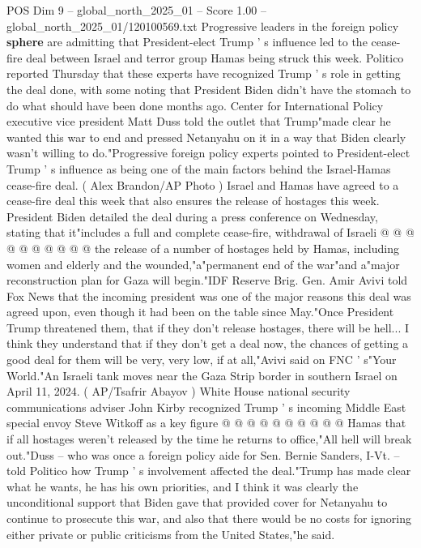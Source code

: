 \begin{textsample}{POS Dim 9 – global\_north\_2025\_01 – Score 1.00 – global\_north\_2025\_01/120100569.txt}  \label{ex:f9_pos_353}
Progressive leaders in the foreign policy \textbf{sphere} are admitting that President-elect Trump ' s influence led to the cease-fire deal between Israel and terror group Hamas being struck this week.
Politico reported Thursday that these experts have recognized Trump ' s role in getting the deal done, with some noting that President Biden didn't have the stomach to do what should have been done months ago.
Center for International Policy executive vice president Matt Duss told the outlet that Trump"made clear he wanted this war to end and pressed Netanyahu on it in a way that Biden clearly wasn't willing to do."Progressive foreign policy experts pointed to President-elect Trump ' s influence as being one of the main factors behind the Israel-Hamas cease-fire deal. ( Alex Brandon/AP Photo ) Israel and Hamas have agreed to a cease-fire deal this week that also ensures the release of hostages this week.
President Biden detailed the deal during a press conference on Wednesday, stating that it"includes a full and complete cease-fire, withdrawal of Israeli @ @ @ @ @ @ @ @ @ @ the release of a number of hostages held by Hamas, including women and elderly and the wounded,"a"permanent end of the war"and a"major reconstruction plan for Gaza will begin."IDF Reserve Brig.
Gen.
Amir Avivi told Fox News that the incoming president was one of the major reasons this deal was agreed upon, even though it had been on the table since May."Once President Trump threatened them, that if they don't release hostages, there will be hell...
I think they understand that if they don't get a deal now, the chances of getting a good deal for them will be very, very low, if at all,"Avivi said on FNC ' s"Your World."An Israeli tank moves near the Gaza Strip border in southern Israel on April 11, 2024. ( AP/Tsafrir Abayov ) White House national security communications adviser John Kirby recognized Trump ' s incoming Middle East special envoy Steve Witkoff as a key figure @ @ @ @ @ @ @ @ @ @ Hamas that if all hostages weren't released by the time he returns to office,"All hell will break out."Duss -- who was once a foreign policy aide for Sen.
Bernie Sanders, I-Vt. -- told Politico how Trump ' s involvement affected the deal."Trump has made clear what he wants, he has his own priorities, and I think it was clearly the unconditional support that Biden gave that provided cover for Netanyahu to continue to prosecute this war, and also that there would be no costs for ignoring either private or public criticisms from the United States,"he said.

\end{textsample}
